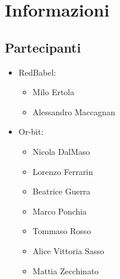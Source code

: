\section{Informazioni}
\subsection{Partecipanti}

\begin{itemize}
	\item RedBabel:
	\begin{itemize}
		\item Milo Ertola
		\item Alessandro Maccagnan 
	\end{itemize}
	\item Or-bit:
	\begin{itemize}
		\item Nicola DalMaso
		\item Lorenzo Ferrarin
		\item Beatrice Guerra
		\item Marco Ponchia
		\item Tommaso Rosso
		\item Alice Vittoria Sasso
		\item Mattia Zecchinato
	\end{itemize}
\end{itemize}

\clearpage


